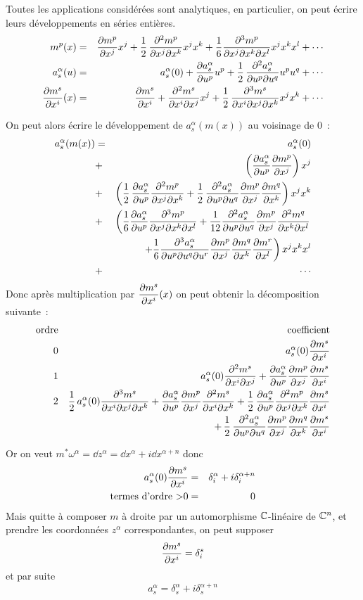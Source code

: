\documentclass[a4paper,draft]{amsart}
\begin{document}
Toutes les applications considérées sont analytiques, en particulier, on peut écrire leurs développements en séries entières.
\begin{eqnarray}
m^p(x) &=& \dpp{m^p}{x^j}x^j + \demi \dppp{m^p}{x^j}{x^k} x^j x^k + \dfrac{1}{6} \dpppp{m^p}{x^j}{x^k}{x^l}x^j x^k x^l + \cdots \\
a_s^\alpha(u) &=& a_s^\alpha(0) + \dpp{a_s^\alpha}{u^p}u^p + \demi \dppp{a_s^\alpha}{u^p}{u^q}u^p u^q + \cdots \\
\dpp{m^s}{x^i}(x) &=& \dpp{m^s}{x^i} + \dppp{m^s}{x^i}{x^j}x^j + \demi \dpppp{m^s}{x^i}{x^j}{x^k}x^j x^k + \cdots
\end{eqnarray}

On peut alors écrire le développement de $a^\alpha_s(m(x))$ au voisinage de $0$~:
\begin{eqnarray*}
a^\alpha_s(m(x)) & = & a_s^\alpha(0) \\
				 & + &\left(\dpp{a_s^\alpha}{u^p}\dpp{m^p}{x^j}\right)x^j \\
				 & + &\left(\demi \dpp{a_s^\alpha}{u^p}\dppp{m^p}{x^j}{x^k} + \demi \dppp{a_s^\alpha}{u^p}{u^q}\dpp{m^p}{x^j}\dpp{m^q}{x^k}\right)x^jx^k \\
				 & + &\left(
				 \dfrac{1}{6}\dpp{a_s^\alpha}{u^p}\dpppp{m^p}{x^j}{x^k}{x^l} + \dfrac{1}{12} \dppp{a_s^\alpha}{u^p}{u^q}			 \dpp{m^p}{x^j}\dppp{m^q}{x^k}{x^l}\right.\\
				 &   &\left.\quad + \dfrac{1}{6} \dpppp{a_s^\alpha}{u^p}{u^q}{u^r}\dpp{m^p}{x^j}\dpp{m^q}{x^k}\dpp{m^r}{x^l}
				\right) x^j x^k x^l \\
				 & + &\cdots
\end{eqnarray*}
Donc après multiplication par $\dpp{m^s}{x^i}(x)$ on peut obtenir la décomposition suivante~:
\begin{eqnarray*}
\text{ordre} & & \text{coefficient} \\ 
0 & & a_s^\alpha(0)\dpp{m^s}{x^i} \\ 
1 & & a_s^\alpha(0)\dppp{m^s}{x^i}{x^j} + \dpp{a_s^\alpha}{u^p}\dpp{m^p}{x^j}\dpp{m^s}{x^i} \\ 
2 & & \demi a_s^\alpha(0)\dpppp{m^s}{x^i}{x^j}{x^k} + \dpp{a_s^\alpha}{u^p}\dpp{m^p}{x^j}\dppp{m^s}{x^i}{x^k} +  \demi \dpp{a_s^\alpha}{u^p}\dppp{m^p}{x^j}{x^k}\dpp{m^s}{x^i} \\
  & & \qquad + \demi \dppp{a_s^\alpha}{u^p}{u^q}\dpp{m^p}{x^j}\dpp{m^q}{x^k}\dpp{m^s}{x^i}
\end{eqnarray*} 

Or on veut $m^*\omega^\alpha = \dd z^\alpha = \dd x^\alpha + i \dd x^{\alpha + n}$ donc 
\begin{eqnarray*}
a_s^\alpha(0)\dpp{m^s}{x^i} &=& \delta_i^\alpha + i \delta_i^{\alpha+n}\\
\text{termes d'ordre >}0 &=& 0
\end{eqnarray*}
Mais quitte à composer $m$ à droite par un automorphisme $\C$-linéaire de $\C^n$, et prendre les coordonnées $z^\alpha$ correspondantes, on peut supposer 
\[
\dpp{m^s}{x^i} = \delta_i^s
\]
et par suite
\[
a_s^\alpha = \delta_s^\alpha + i \delta_s^{\alpha + n}
\]
\end{document}
